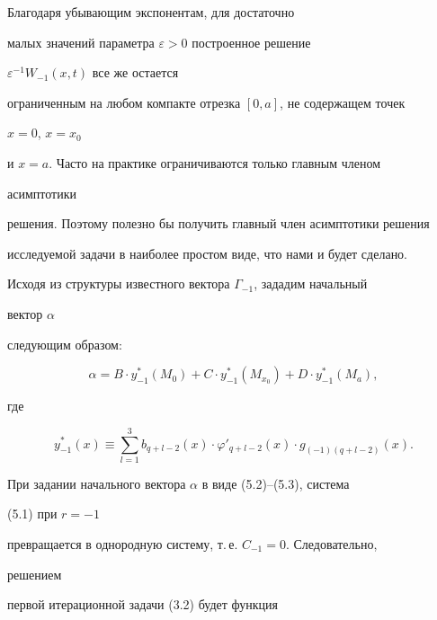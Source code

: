  


\begin{notenonum} Благодаря убывающим экспонентам, для достаточно 


малых значений параметра $\varepsilon>0$ построенное решение 


$\varepsilon^{-1}W_{-1}(x,t)$ все же остается 


ограниченным на любом компакте отрезка $[0,a]$, не содержащем точек 


$x=0$, $x=x_0$ 


и $x=a$. Часто на практике ограничиваются только главным членом 


асимптотики 


решения. Поэтому полезно бы получить главный член асимптотики решения 


исследуемой задачи в наиболее простом виде, что нами и будет сделано. 


\end{notenonum} 


 


Исходя из структуры известного вектора $\Gamma_{-1}$, зададим начальный 


вектор $\alpha$ 


следующим образом: 


\begin{equation} 


\alpha=B\cdot y^*_{-1}(M_0)+C\cdot y^*_{-1}(M_{x_0})+ 


D\cdot y^*_{-1}(M_a), 


\end{equation} 


где 


\begin{equation} 


y^*_{-1}(x)\equiv\sum^3_{l=1}b_{q+l-2}(x)\cdot 


\varphi'_{q+l-2}(x)\cdot g_{(-1)(q+l-2)}(x). 


\end{equation} 


 


При задании начального вектора $\alpha$ в виде (5.2)--(5.3), система 


(5.1) при $r=-1$ 


превращается в однородную систему, т.\,е. $C_{-1}=0$. Следовательно, 


решением 


первой итерационной задачи (3.2) будет функция 



